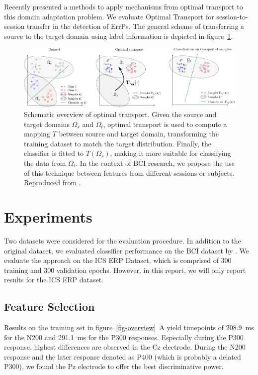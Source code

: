 \documentclass[10pt,a4paper]{article}
\begin{document}
Recently \cite{Courty} presented a methods to apply mechanisms from optimal transport \cite{Cuturi2013,Flamary2016} to this domain adaptation problem.
We evaluate Optimal Transport for session-to-session transfer in the detection of ErrPs.
The general scheme of transferring a source to the target domain using label information is depicted in figure~\ref{fig:optimal-transport}.

\begin{figure}
    \includegraphics[width=\textwidth]{img/ot.pdf}
    \caption{Schematic overview of optimal transport. Given the source and target domains $\Omega_s$ and $\Omega_t$, optimal transport is used to compute a mapping $T$ between source and target domain, transforming the training dataset to match the target distribution.
    Finally, the classifier is fitted to $T(\Omega_s)$, making it more suitable for classifying the data from $\Omega_t$.
    In the context of BCI research, we propose the use of this technique between features from different sessions or subjects.
    Reproduced from \cite{Courty}.}
    \label{fig:optimal-transport}
\end{figure}

\section{Experiments}

Two datasets were considered for the evaluation procedure.
In addition to the original dataset, we evaluated classifier performance on the BCI dataset by \cite{TODO}.
We evaluate the approach on the ICS ERP Dataset, which is comprised of 300 training and 300 validation epochs.
However, in this report, we will only report results for the ICS ERP dataset.

\subsection{Feature Selection}

Results on the training set in figure~\ref{fig-overview}~A yield timepoints of 208.9~ms for the N200 and 291.1~ms for the P300 responses.
Especially during the P300 response, highest differences are observed in the Cz electrode.
During the N200 response and the later response denoted as P400 (which is probably a delated P300), we found the Pz electrode to offer the best discriminative power.
\end{document}
